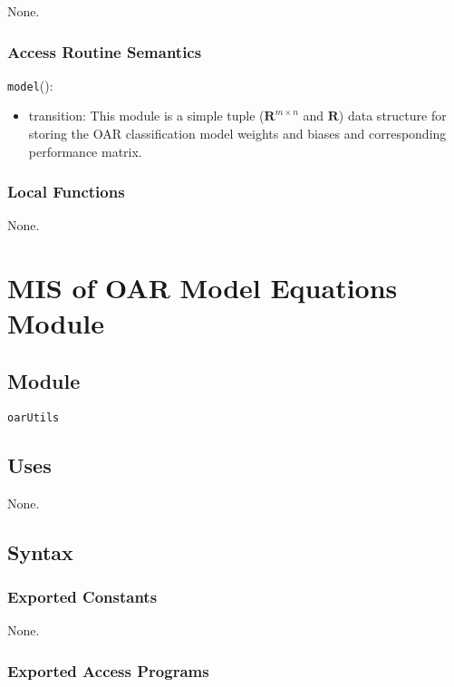 \documentclass[12pt, titlepage]{article}
\def\code#1{\texttt{#1}}
\begin{document}
None.

\subsubsection{Access Routine Semantics}

\noindent \code{model}():
\begin{itemize}
\item transition: This module is a simple tuple ($\mathbf{R}^{m \times n}$ and $\mathbf{R}$) data structure for storing the OAR classification model weights and biases and corresponding performance matrix.
\end{itemize}

\subsubsection{Local Functions}

None.

\section{MIS of OAR Model Equations Module} \label{ModuleOME} 

\subsection{Module}

\code{oarUtils}

\subsection{Uses}

None.

\subsection{Syntax}

\subsubsection{Exported Constants}

None.

\subsubsection{Exported Access Programs}
\end{document}
